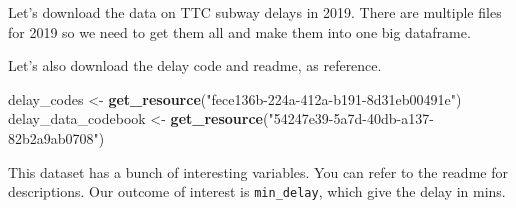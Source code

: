 \documentclass[
]{book}
\newenvironment{Shaded}{\begin{snugshade}}{\end{snugshade}}
\newcommand{\CommentTok}[1]{\textcolor[rgb]{0.56,0.35,0.01}{\textit{#1}}}
\newcommand{\ControlFlowTok}[1]{\textcolor[rgb]{0.13,0.29,0.53}{\textbf{#1}}}
\newcommand{\DataTypeTok}[1]{\textcolor[rgb]{0.13,0.29,0.53}{#1}}
\newcommand{\DecValTok}[1]{\textcolor[rgb]{0.00,0.00,0.81}{#1}}
\newcommand{\KeywordTok}[1]{\textcolor[rgb]{0.13,0.29,0.53}{\textbf{#1}}}
\newcommand{\NormalTok}[1]{#1}
\newcommand{\OperatorTok}[1]{\textcolor[rgb]{0.81,0.36,0.00}{\textbf{#1}}}
\newcommand{\StringTok}[1]{\textcolor[rgb]{0.31,0.60,0.02}{#1}}
\begin{document}
Let's download the data on TTC subway delays in 2019. There are multiple files for 2019 so we need to get them all and make them into one big dataframe.

\begin{Shaded}
\end{Shaded}

Let's also download the delay code and readme, as reference.

\begin{Shaded}
\begin{Highlighting}[]
\NormalTok{delay_codes <-}\StringTok{ }\KeywordTok{get_resource}\NormalTok{(}\StringTok{"fece136b-224a-412a-b191-8d31eb00491e"}\NormalTok{)}
\NormalTok{delay_data_codebook <-}\StringTok{ }\KeywordTok{get_resource}\NormalTok{(}\StringTok{"54247e39-5a7d-40db-a137-82b2a9ab0708"}\NormalTok{)}
\end{Highlighting}
\end{Shaded}

This dataset has a bunch of interesting variables. You can refer to the readme for descriptions. Our outcome of interest is \texttt{min\_delay}, which give the delay in mins.
\end{document}
